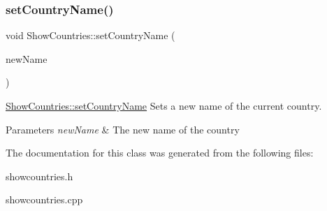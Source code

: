 \subsubsection{\texorpdfstring{setCountryName()}{setCountryName()}}
{\footnotesize\ttfamily void Show\+Countries\+::set\+Country\+Name (\begin{DoxyParamCaption}\item[{Q\+String}]{new\+Name }\end{DoxyParamCaption})}



\mbox{\hyperlink{class_show_countries_aefa9daeff484f4028ea5a280b280dd36}{Show\+Countries\+::set\+Country\+Name}} Sets a new name of the current country. 


\begin{DoxyParams}{Parameters}
{\em new\+Name} & The new name of the country \\
\hline
\end{DoxyParams}


The documentation for this class was generated from the following files\+:\begin{DoxyCompactItemize}
\item 
showcountries.\+h\item 
showcountries.\+cpp\end{DoxyCompactItemize}
